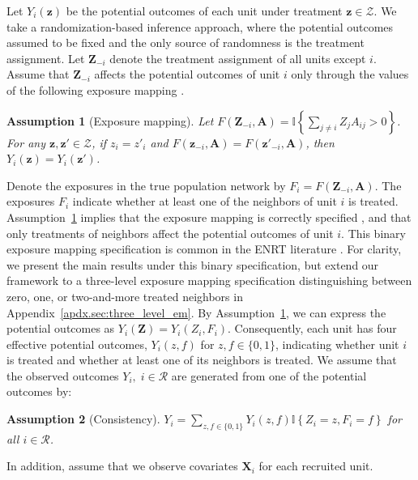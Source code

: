 \documentclass[11pt]{article}
\newtheorem{assumption}{Assumption}
\theoremstyle{definition}
\def \bz {\boldsymbol{z}}
\def \bZ {\boldsymbol{Z}}
\def \bA {\boldsymbol{A}}
\def \bX {\boldsymbol{X}}
\def \cR {\mathcal{R}}
\begin{document}
Let $Y_i(\bz)$ be the potential outcomes of each unit under treatment $\bz \in \mathcal{Z}$.
We take a randomization-based inference approach,
where the potential outcomes assumed to be fixed and the only source of randomness is the treatment assignment. 
Let $\bZ_{-i}$ denote the treatment assignment of all units except $i$.
Assume that $\bZ_{-i}$ affects the potential outcomes of unit $i$ only
 through the values of the following exposure mapping \citep{Manski2013,aronow_estimating_2017,Forastiere2020}.
\begin{assumption}[Exposure mapping]
\label{ass:expos_map}
    Let $F(\bZ_{-i},\bA) =\mathbb{I}\left\{\sum_{j\neq i} Z_jA_{ij} > 0\right\}$. For any $\bz, \bz' \in \mathcal{Z}$, if $z_i = z'_i$ and $F(\bz_{-i},\bA) = F(\bz'_{-i},\bA)$, then $Y_i(\bz) = Y_i(\bz')$. 
\end{assumption}
Denote the exposures in the true population network by $F_i = F(\bZ_{-i}, \bA)$.
The exposures $F_i$ indicate whether at least one of the neighbors of unit $i$ is treated.
Assumption~\ref{ass:expos_map} implies that the exposure mapping is correctly specified \citep{Saevje2023},
and that only treatments of neighbors affect the potential outcomes of unit $i$.
This binary exposure mapping specification is common in the ENRT literature \citep{Buchanan2018,Chao2023,Fang2023}.
For clarity, we present the main results under this binary specification, 
but extend our framework to a three-level exposure mapping specification distinguishing
between zero, one, or two-and-more treated neighbors in Appendix~\ref{apdx.sec:three_level_em}.
By Assumption~\ref{ass:expos_map}, we can express the potential outcomes as
$Y_i(\bZ)=Y_i(Z_i,F_i)$.
Consequently, each unit has four effective potential outcomes,
$Y_i(z,f)$ for $z,f\in\{0,1\}$, indicating whether unit $i$ is treated and whether at least one of its neighbors is treated.
We assume that the observed outcomes $Y_i, \; i \in \cR$ are generated from one of the potential outcomes by:
\begin{assumption}[Consistency]
\label{ass:consis}
$Y_i = \sum_{z,f \in \{0,1\}}Y_i(z,f) \mathbb{I}\left\{Z_i=z, F_i=f\right\}$ for all $i \in \cR$.    
\end{assumption}
In addition, assume that we observe covariates $\bX_i$ for each recruited unit.
\end{document}
